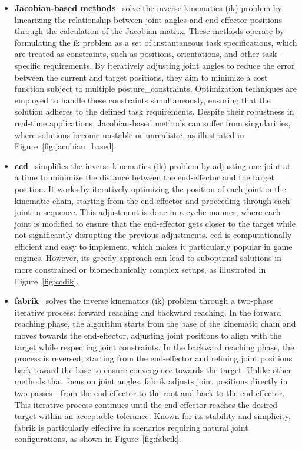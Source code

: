 \documentclass[../../main.tex]{subfiles}
\begin{document}
\begin{itemize} 
  \item \textbf{Jacobian-based methods}~\cite{4648032} solve the inverse kinematics (\gls{ik}) problem by linearizing the relationship between joint angles and end-effector positions through the calculation of the Jacobian matrix. These methods operate by formulating the \gls{ik} problem as a set of instantaneous task specifications, which are treated as constraints, such as positions, orientations, and other task-specific requirements. By iteratively adjusting joint angles to reduce the error between the current and target positions, they aim to minimize a cost function subject to multiple \gls{posture_constraint}s. Optimization techniques are employed to handle these constraints simultaneously, ensuring that the solution adheres to the defined task requirements. Despite their robustness in real-time applications, Jacobian-based methods can suffer from singularities, where solutions become unstable or unrealistic, as illustrated in Figure~\ref{fig:jacobian_based}.

  \item \textbf{\gls{ccd}}~\cite{kenwright2012inverse} simplifies the inverse kinematics (\gls{ik}) problem by adjusting one joint at a time to minimize the distance between the end-effector and the target position. It works by iteratively optimizing the position of each joint in the kinematic chain, starting from the end-effector and proceeding through each joint in sequence. This adjustment is done in a cyclic manner, where each joint is modified to ensure that the end-effector gets closer to the target while not significantly disrupting the previous adjustments. \gls{ccd} is computationally efficient and easy to implement, which makes it particularly popular in game engines. However, its greedy approach can lead to suboptimal solutions in more constrained or biomechanically complex setups, as illustrated in Figure~\ref{fig:ccdik}.

  \item \textbf{\gls{fabrik}}~\cite{aristidou2011fabrik} solves the inverse kinematics (\gls{ik}) problem through a two-phase iterative process: forward reaching and backward reaching. In the forward reaching phase, the algorithm starts from the base of the kinematic chain and moves towards the end-effector, adjusting joint positions to align with the target while respecting joint constraints. In the backward reaching phase, the process is reversed, starting from the end-effector and refining joint positions back toward the base to ensure convergence towards the target. Unlike other methods that focus on joint angles, \gls{fabrik} adjusts joint positions directly in two passes—from the end-effector to the root and back to the end-effector. This iterative process continues until the end-effector reaches the desired target within an acceptable tolerance. Known for its stability and simplicity, \gls{fabrik} is particularly effective in scenarios requiring natural joint configurations, as shown in Figure~\ref{fig:fabrik}.
\end{itemize}
\end{document}
